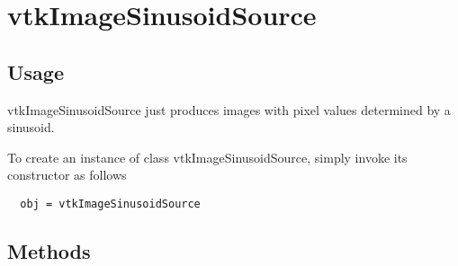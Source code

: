 \section{vtkImageSinusoidSource}

\subsection{Usage}

 vtkImageSinusoidSource just produces images with pixel values determined 
 by a sinusoid.

To create an instance of class vtkImageSinusoidSource, simply
invoke its constructor as follows
\begin{verbatim}
  obj = vtkImageSinusoidSource
\end{verbatim}
\subsection{Methods}

